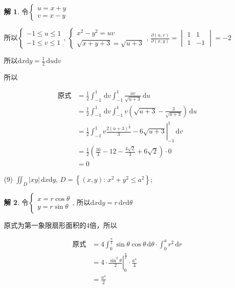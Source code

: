 \documentclass[a4paper,12pt]{article}
\theoremstyle{definition}
\newtheorem*{sol}{解}
\begin{document}
\begin{sol}
    令$\begin{cases}
            u=x+y \\
            v=x-y
        \end{cases}$

    所以$\begin{cases}
            -1\leq u\leq 1 \\
            -1\leq v\leq 1
        \end{cases}$, $\begin{cases}
            x^2-y^2=uv \\
            \sqrt{x+y+3}=\sqrt{u+3}
        \end{cases}$, $\frac{\partial(u,v)}{\partial(x,y)}=\begin{vmatrix}
            1 & 1  \\
            1 & -1
        \end{vmatrix}=-2$

    所以$\mathrm{d}x\mathrm{d}y=\frac{1}{2}\,\mathrm{d}u\mathrm{d}v$

    所以

    \begin{align*}
        \text{原式}
         & =\frac{1}{2}\int_{-1}^1\,\mathrm{d}v\int_{-1}^1\frac{uv}{\sqrt{u+3}}\,\mathrm{d}u                   \\
         & =\frac{1}{2}\int_{-1}^1\,\mathrm{d}v\int_{-1}^1v(\sqrt{u+3}-\frac{3}{\sqrt{u+3}})\,\mathrm{d}u      \\
         & =\frac{1}{2}\int_{-1}^1v\left.\frac{2(u+3)^{\frac{3}{2}}}{3}-6\sqrt{u+3}\right|_{-1}^1\,\mathrm{d}v \\
         & =\frac{1}{2}(\frac{16}{3}-12-\frac{4\sqrt{2}}{3}+6\sqrt{2})\cdot 0                                  \\
         & =0
    \end{align*}
\end{sol}
(9) $\displaystyle\iint_{D} |xy|\,\mathrm{d}x\mathrm{d}y$, $D = \left\{(x,y):\,x^2 + y^2 \leq a^2\right\}$;
\begin{sol}
    令$\begin{cases}
            x=r\cos\theta \\
            y=r\sin\theta
        \end{cases}$, 所以$\mathrm{d}x\mathrm{d}y=r\,\mathrm{d}r\mathrm{d}\theta$

    原式为第一象限扇形面积的4倍，所以

    \begin{align*}
        \text{原式}
         & =4\int_0^{\frac{\pi}{2}}\sin\theta\cos\theta\,\mathrm{d}\theta\cdot\int_0^ar^2\,\mathrm{d}r \\
         & =4\cdot\left.\frac{\sin^2\theta}{2}\right|_0^{\frac{\pi}{2}}\cdot\frac{a^4}{4}              \\
         & =\frac{a^4}{2}
    \end{align*}
\end{sol}
\end{document}
